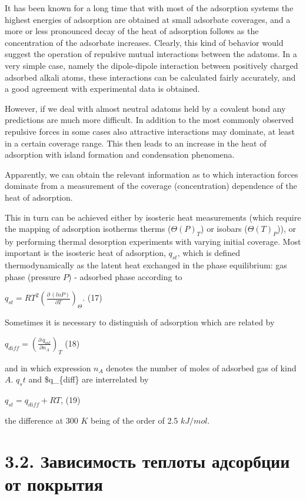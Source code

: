 \documentclass[11pt]{article}
\begin{document}
It has been known for a long time that with most of the adsorption
systems the highest energies of adsorption are obtained at small
adsorbate coverages, and a more or less pronounced decay of the heat of
adsorption follows as the concentration of the adsorbate increases.
Clearly, this kind of behavior would suggest the operation of repulsive
mutual interactions between the adatoms. In a very simple case, namely
the dipole-dipole interaction between positively charged adsorbed alkali
atoms, these interactions can be calculated fairly accurately, and a
good agreement with experimental data is obtained.

However, if we deal with almost neutral adatoms held by a covalent bond
any predictions are much more difficult. In addition to the most
commonly observed repulsive forces in some cases also attractive
interactions may dominate, at least in a certain coverage range. This
then leads to an increase in the heat of adsorption with island
formation and condensation phenomena.

Apparently, we can obtain the relevant information as to which
interaction forces dominate from a measurement of the coverage
(concentration) dependence of the heat of adsorption.

This in turn can be achieved either by isosteric heat measurements
(which require the mapping of adsorption isotherms therms
(\(\Theta(P)_T\)) or isobars (\(\Theta(T)_P\))), or by performing
thermal desorption experiments with varying initial coverage. Most
important is the isosteric heat of adsorption, \(q_{st}\), which is
defined thermodynamically as the latent heat exchanged in the phase
equilibrium: gas phase (pressure \(P\)) - adsorbed phase according to

\(q_{st} = R T^2 \left( \frac{\partial \, \left(ln P\right)}{\partial T}\right)_{\Theta}\).
(17)

Sometimes it is necessary to distinguish of adsorption which are related
by

\(q_{diff} = \left( \frac{\partial \, q_{int}}{\partial n_A}\right)_{T}\)
(18)

and in which expression \(n_A\) denotes the number of moles of adsorbed
gas of kind \(A\). \(q_st\) and \$q\_\{diff\} are interrelated by

\(q_{st} = q_{diff} + R T\), (19)

the difference at 300 \(K\) being of the order of 2.5 \(kJ/mol\).

    \section{3.2. Зависимость теплоты адсорбции от
покрытия}\label{ux437ux430ux432ux438ux441ux438ux43cux43eux441ux442ux44c-ux442ux435ux43fux43bux43eux442ux44b-ux430ux434ux441ux43eux440ux431ux446ux438ux438-ux43eux442-ux43fux43eux43aux440ux44bux442ux438ux44f}
\end{document}
